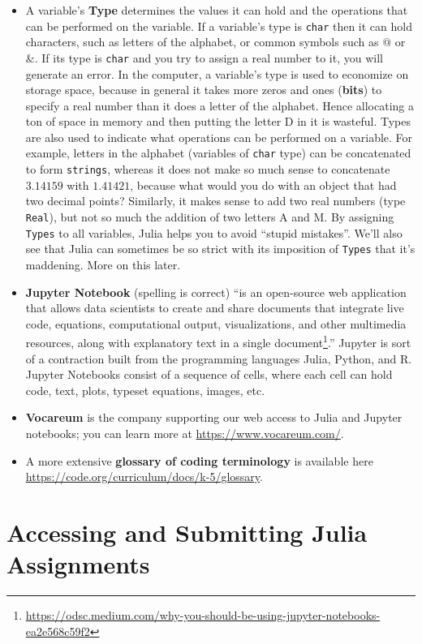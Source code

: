 \begin{itemize}
    \item A variable's \textbf{Type} determines the values it can hold and the operations that can be performed on the variable. If a variable's type is \texttt{char} then it can hold characters, such as letters of the alphabet, or common symbols such as $@$ or $\&$. If its type is \texttt{char} and you try to assign a real number to it, you will generate an error. In the computer, a variable's type is used to economize on storage space, because in general it takes more zeros and ones (\textbf{bits}) to specify a real number than it does a letter of the alphabet. Hence allocating a ton of space in memory and then putting the letter D in it is wasteful. Types are also used to indicate what operations can be performed on a variable. For example, letters in the alphabet (variables of \texttt{char} type) can be concatenated to form \texttt{strings}, whereas it does not make so much sense to concatenate $3.14159$ with $1.41421$, because what would you do with an object that had two decimal points? Similarly, it makes sense to add two real numbers (type \texttt{Real}), but not so much the addition of two letters A and M. By assigning \texttt{Types} to all variables, Julia helps you to avoid ``stupid mistakes''. We'll also see that Julia can sometimes be so strict with its imposition of \texttt{Types} that it's maddening. More on this later.
    \item \textbf{Jupyter Notebook} (spelling is correct) ``is an open-source web application that allows data scientists to create and share documents that integrate live code, equations, computational output, visualizations, and other multimedia resources, along with explanatory text in a single document\footnote{\url{https://odsc.medium.com/why-you-should-be-using-jupyter-notebooks-ea2e568c59f2}}.'' Jupyter is sort of a contraction built from the programming languages Julia, Python, and R.  Jupyter Notebooks consist of a sequence of cells, where each cell can hold code, text, plots, typeset equations, images, etc.
    \item \textbf{Vocareum} is the company supporting our web access to Julia and Jupyter notebooks; you can learn more at \url{https://www.vocareum.com/}. 
     \item A more extensive \textbf{glossary of coding terminology} is available here \url{https://code.org/curriculum/docs/k-5/glossary}. 
\end{itemize}

\section{Accessing and Submitting Julia Assignments}
\label{sec:Vocareum}

